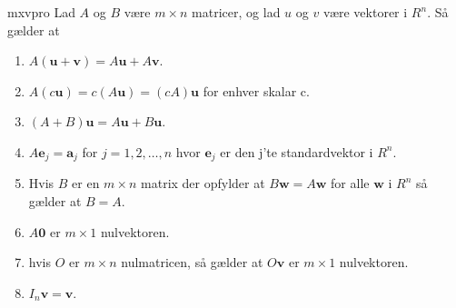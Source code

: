 \begin{thm}{}{mxvpro}
Lad $A$ og $B$ være $m \times n$ matricer, og lad $u$ og $v$ være vektorer i $R^n$. Så gælder at
\begin{enumerate}[label=(\alph*)]
\item $A(\mathbf{u}+\mathbf{v})=A\mathbf{u}+A\mathbf{v}$.
\item $A(c\mathbf{u})=c(A\mathbf{u})=(cA)\mathbf{u}$ for enhver skalar c.
\item $(A+B)\mathbf{u}=A\mathbf{u}+B\mathbf{u}$.
\item $A\mathbf{e}_j=\mathbf{a}_j$ for $j=1,2,\ldots,n$ hvor $\mathbf{e}_j$ er den j'te standardvektor i $R^n$.
\item Hvis $B$ er en $m \times n$ matrix der opfylder at $B\mathbf{w}=A\mathbf{w}$ for alle $\mathbf{w}$ i $R^n$ så gælder at $B=A$.
\item $A\mathbf{0}$ er $m \times 1$ nulvektoren.
\item hvis $O$ er $m \times n$ nulmatricen, så gælder at $O\mathbf{v}$ er $m \times 1$ nulvektoren.
\item $I_n\mathbf{v}=\mathbf{v}$.
\end{enumerate}
\end{thm}
